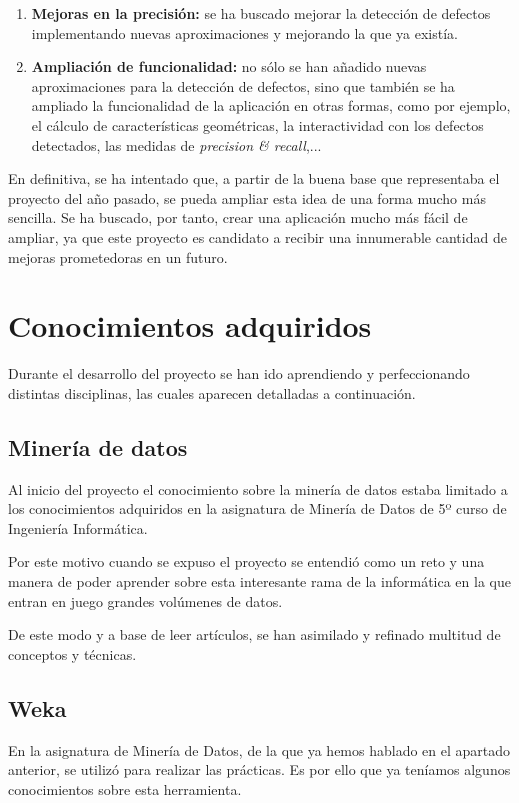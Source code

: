 \begin{enumerate}
\item \textbf{Mejoras en la precisión:} se ha buscado mejorar la detección de defectos implementando nuevas aproximaciones y mejorando la que ya existía.

\item \textbf{Ampliación de funcionalidad:} no sólo se han añadido nuevas aproximaciones para la detección de defectos, sino que también se ha ampliado la funcionalidad de la aplicación en otras formas, como por ejemplo, el cálculo de características geométricas, la interactividad con los defectos detectados, las medidas de \emph{precision \& recall},...

\end{enumerate}

En definitiva, se ha intentado que, a partir de la buena base que representaba el proyecto del año pasado, se pueda ampliar esta idea de una forma mucho más sencilla. Se ha buscado, por tanto, crear una aplicación mucho más fácil de ampliar, ya que este proyecto es candidato a recibir una innumerable cantidad de mejoras prometedoras en un futuro.


\section{Conocimientos adquiridos}
Durante el desarrollo del proyecto se han ido aprendiendo y perfeccionando distintas disciplinas, las cuales aparecen detalladas a continuación.

\subsection{Minería de datos}
Al inicio del proyecto el conocimiento sobre la minería de datos estaba limitado a los conocimientos adquiridos en la asignatura de Minería de Datos de 5º curso de Ingeniería Informática.

Por este motivo cuando se expuso el proyecto se entendió como un reto y una manera de poder aprender sobre esta interesante rama de la informática en la que entran en juego grandes volúmenes de datos.

De este modo y a base de leer artículos, se han asimilado y refinado multitud de conceptos y técnicas.

\subsection{Weka}
En la asignatura de Minería de Datos, de la que ya hemos hablado en el apartado anterior, se utilizó \weka{} para realizar las prácticas. Es por ello que ya teníamos algunos conocimientos sobre esta herramienta.

